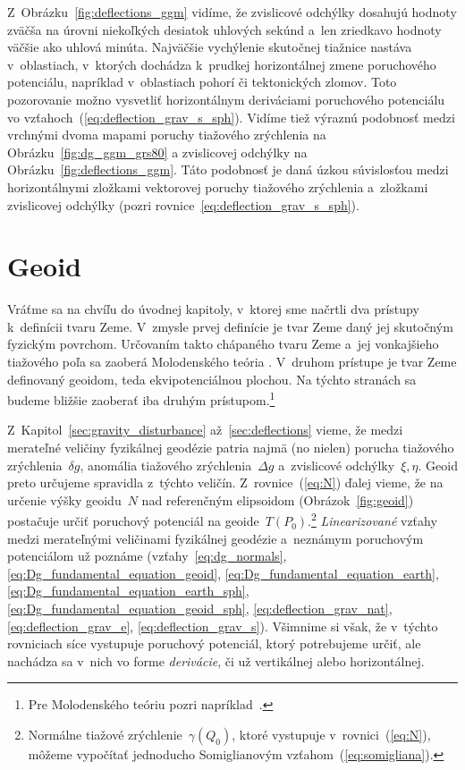 \documentclass[a4paper, 12pt]{book}
\begin{document}
Z~Obrázku~\ref{fig:deflections_ggm} vidíme, že zvislicové odchýlky dosahujú 
hodnoty zväčša na úrovni niekoľkých desiatok uhlových sekúnd a~len zriedkavo 
hodnoty väčšie ako uhlová minúta.  Najväčšie vychýlenie skutočnej tiažnice 
nastáva v~oblastiach, v~ktorých dochádza k~prudkej horizontálnej zmene 
poruchového potenciálu, napríklad v~oblastiach pohorí či tektonických zlomov.  
Toto pozorovanie možno vysvetliť horizontálnym deriváciami poruchového 
potenciálu vo vzťahoch~(\ref{eq:deflection_grav_s_sph}).  Vidíme tiež výraznú 
podobnosť medzi vrchnými dvoma mapami poruchy tiažového zrýchlenia na 
Obrázku~\ref{fig:dg_ggm_grs80} a zvislicovej odchýlky na 
Obrázku~\ref{fig:deflections_ggm}.  Táto podobnosť je daná úzkou súvislosťou 
medzi horizontálnymi zložkami vektorovej poruchy tiažového zrýchlenia 
a~zložkami zvislicovej odchýlky (pozri rovnice~\ref{eq:deflection_grav_s_sph}).







\chapter{Geoid}
\label{sec:geoid}

Vráťme sa na chvíľu do úvodnej kapitoly, v~ktorej sme načrtli dva prístupy 
k~definícii tvaru Zeme.  V~zmysle prvej definície je tvar Zeme daný jej 
skutočným fyzickým povrchom.  Určovaním takto chápaného tvaru Zeme a~jej 
vonkajšieho tiažového poľa sa zaoberá Molodenského teória 
\parencite{Molodensky1962,Borre_chapter8,MoritzAdvancedGeodesy,MoritzPhysicalGeodesy}.  
V~druhom prístupe je tvar Zeme definovaný geoidom, teda ekvipotenciálnou 
plochou.  Na týchto stranách sa budeme bližšie zaoberať iba druhým 
prístupom.\footnote{Pre Molodenského teóriu pozri 
napríklad~\textcite{Janak2006}.}

Z~Kapitol~\ref{sec:gravity_disturbance} až~\ref{sec:deflections} vieme, že 
medzi merateľné veličiny fyzikálnej geodézie patria najmä (no nielen) porucha 
tiažového zrýchlenia~$\delta g$, anomália tiažového zrýchlenia~$\Delta g$ 
a~zvislicové odchýlky~$\xi, \eta$.  Geoid preto určujeme spravidla z~týchto 
veličín.  Z~rovnice~(\ref{eq:N}) ďalej vieme, že na určenie výšky geoidu~$N$ 
nad referenčným elipsoidom (Obrázok~\ref{fig:geoid}) postačuje určiť poruchový 
potenciál na geoide~$T(P_0)$.\footnote{Normálne tiažové 
zrýchlenie~$\gamma(Q_0)$, ktoré vystupuje v~rovnici~(\ref{eq:N}), môžeme 
vypočítať jednoducho Somiglianovým vzťahom~(\ref{eq:somigliana}).}  
\emph{Linearizované} vzťahy medzi merateľnými veličinami fyzikálnej geodézie 
a~neznámym poruchovým potenciálom už poznáme (vzťahy~\ref{eq:dg_normals}, 
\ref{eq:Dg_fundamental_equation_geoid}, \ref{eq:Dg_fundamental_equation_earth}, 
\ref{eq:Dg_fundamental_equation_earth_sph}, 
\ref{eq:Dg_fundamental_equation_geoid_sph}, \ref{eq:deflection_grav_nat}, 
\ref{eq:deflection_grav_e}, \ref{eq:deflection_grav_s}).  Všimnime si však, že 
v~týchto rovniciach síce vystupuje poruchový potenciál, ktorý potrebujeme 
určiť, ale nachádza sa v~nich vo forme \emph{derivácie}, či už vertikálnej 
alebo horizontálnej.
\end{document}
